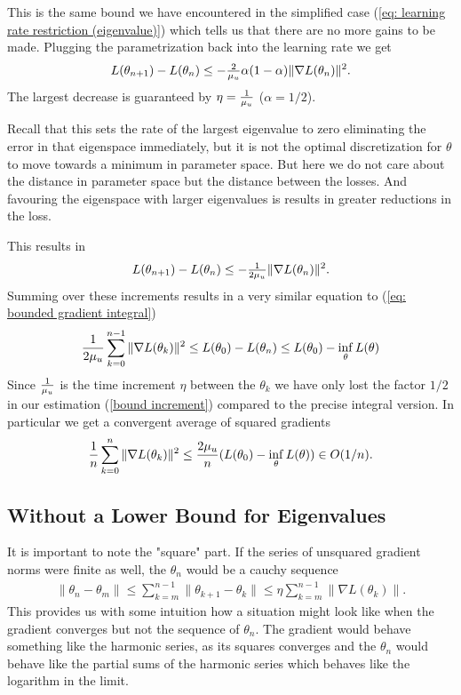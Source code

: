 %
This is the same bound we have encountered in the simplified case (\ref{eq:
learning rate restriction (eigenvalue)}) which tells us that there are no more
gains to be made. Plugging the parametrization back into the learning rate we
get
%
\begin{align*}
	L(\theta_{n+1}) - L(\theta_n)
	\le - \tfrac{2}{\mu_u}\alpha (1-\alpha)\|\nabla L(\theta_n)\|^2.
\end{align*}
%
The largest decrease is guaranteed by \(\eta=\tfrac{1}{\mu_u}\) (\(\alpha=1/2\)).
\begin{remark}
	Recall that this sets the rate of the largest eigenvalue to zero eliminating
	the error in that eigenspace immediately, but it is not the optimal
	discretization for \(\theta\) to move towards a minimum in parameter space.
	But here we do not care about the distance in parameter space but the
	distance between the losses. And favouring the eigenspace with larger
	eigenvalues is results in greater reductions in the loss.
\end{remark}
This results in
%
\begin{align*}
	L(\theta_{n+1}) - L(\theta_n)
	\le - \tfrac{1}{2\mu_u}\|\nabla L(\theta_n)\|^2.
\end{align*}
%
Summing over these increments results in a very similar equation to
(\ref{eq: bounded gradient integral})
%
\begin{align*}
	\frac{1}{2\mu_u} \sum_{k=0}^{n-1}\|\nabla L(\theta_k)\|^2
	\le L(\theta_0) - L(\theta_n)
	\le L(\theta_0) - \inf_{\theta} L(\theta)
\end{align*}
%
Since \(\tfrac{1}{\mu_u}\) is the time increment \(\eta\) between the \(\theta_k\)
we have only lost the factor \(1/2\) in our estimation (\ref{bound increment})
compared to the precise integral version.
In particular we get a convergent average of squared gradients
%
\begin{align*}
	\frac{1}{n} \sum_{k=0}^n \|\nabla L(\theta_k)\|^2
	\le \frac{2 \mu_u}{n} (L(\theta_0) - \inf_\theta L(\theta)) \in O(1/n).
\end{align*}
%
\subsection{Without a Lower Bound for Eigenvalues}
%
It is important to note the "square" part. If the series of unsquared gradient
norms were finite as well, the \(\theta_n\) would be a cauchy sequence
%
\begin{align*}
	\|\theta_n - \theta_m \|
	\le \sum_{k=m}^{n-1} \|\theta_{k+1} - \theta_k\|
	\le \eta \sum_{k=m}^{n-1} \|\nabla L(\theta_k)\|.
\end{align*}
%
This provides us with some intuition how a situation might look like when the
gradient converges but not the sequence of \(\theta_n\). The gradient would
behave something like the harmonic series, as its squares converges and the
\(\theta_n\) would behave like the partial sums of the harmonic series which
behaves like the logarithm in the limit.

